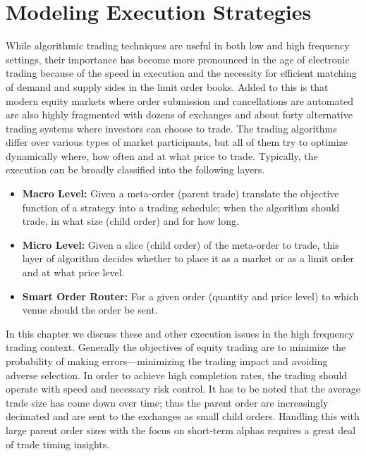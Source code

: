 \chapter{Modeling Execution Strategies}\label{chap:ch_exec_models}

While algorithmic trading techniques are useful in both low and high frequency settings, their importance has become more pronounced in the age of electronic trading because of the speed in execution and the necessity for efficient matching of demand and supply sides in the limit order books. Added to this is that modern equity markets where order submission and cancellations are automated are also highly fragmented with dozens of exchanges and about forty alternative trading systems where investors can choose to trade. The trading algorithms differ over various types of market participants, but all of them try to optimize dynamically where, how often and at what price to trade. Typically, the execution can be broadly classified into the following layers.
	\begin{itemize}
	\item \textbf{Macro Level:} Given a meta-order (parent trade) translate the objective function of a strategy into a trading schedule; when the algorithm should trade, in what size (child order) and for how long.
	\item \textbf{Micro Level:} Given a slice (child order) of the meta-order to trade, this layer of algorithm decides whether to place it as a market or as a  limit order and at what price level.
	\item \textbf{Smart Order Router:} For a given order (quantity and price level) to which venue should the order be sent.
	\end{itemize}


In this chapter we discuss these and other execution issues in the high frequency trading context. Generally the objectives of equity trading are to minimize the probability of making errors---minimizing the trading impact and avoiding adverse selection. In order to achieve high completion rates, the trading should operate with speed and necessary risk control. It has to be noted that the average trade size has come down over time; thus the parent order are increasingly decimated and are sent to the exchanges as small child orders. Handling this with large parent order sizes with the focus on short-term alphas requires a great deal of trade timing insights.  



